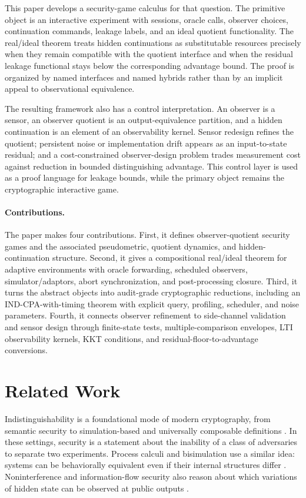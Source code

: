 \documentclass[11pt]{article}
\theoremstyle{definition}
\theoremstyle{plain}
\theoremstyle{remark}
\begin{document}
This paper develops a security-game calculus for that question. The primitive object is an interactive experiment with sessions, oracle calls, observer choices, continuation commands, leakage labels, and an ideal quotient functionality. The real/ideal theorem treats hidden continuations as substitutable resources precisely when they remain compatible with the quotient interface and when the residual leakage functional stays below the corresponding advantage bound. The proof is organized by named interfaces and named hybrids rather than by an implicit appeal to observational equivalence.

The resulting framework also has a control interpretation. An observer is a sensor, an observer quotient is an output-equivalence partition, and a hidden continuation is an element of an observability kernel. Sensor redesign refines the quotient; persistent noise or implementation drift appears as an input-to-state residual; and a cost-constrained observer-design problem trades measurement cost against reduction in bounded distinguishing advantage. This control layer is used as a proof language for leakage bounds, while the primary object remains the cryptographic interactive game.

\paragraph{Contributions.}
The paper makes four contributions. First, it defines observer-quotient security games and the associated pseudometric, quotient dynamics, and hidden-continuation structure. Second, it gives a compositional real/ideal theorem for adaptive environments with oracle forwarding, scheduled observers, simulator/adaptors, abort synchronization, and post-processing closure. Third, it turns the abstract objects into audit-grade cryptographic reductions, including an IND-CPA-with-timing theorem with explicit query, profiling, scheduler, and noise parameters. Fourth, it connects observer refinement to side-channel validation and sensor design through finite-state tests, multiple-comparison envelopes, LTI observability kernels, KKT conditions, and residual-floor-to-advantage conversions.

\section{Related Work}

Indistinguishability is a foundational mode of modern cryptography, from semantic security to simulation-based and universally composable definitions \cite{Yao1982,GoldwasserMicali1984,Canetti2001}. In these settings, security is a statement about the inability of a class of adversaries to separate two experiments. Process calculi and bisimulation use a similar idea: systems can be behaviorally equivalent even if their internal structures differ \cite{Park1981,Milner1989}. Noninterference and information-flow security also reason about which variations of hidden state can be observed at public outputs \cite{GoguenMeseguer1982,SabelfeldSands2009,ClarksonSchneider2010}.
\end{document}
